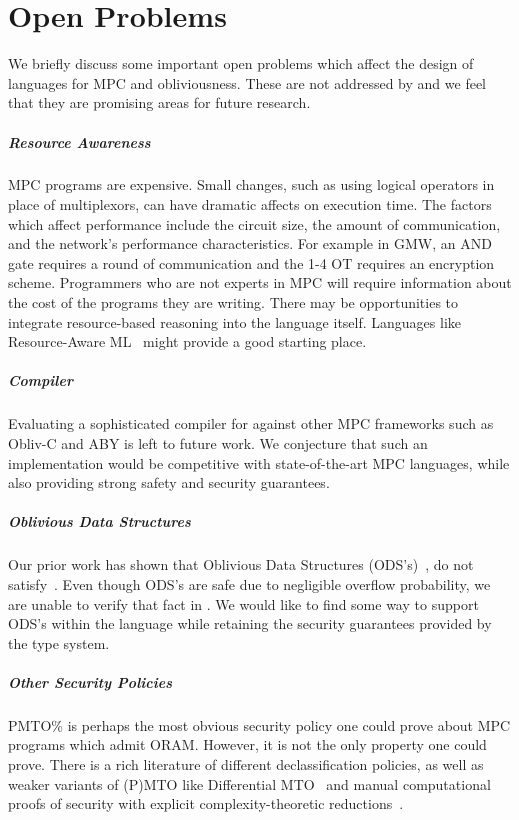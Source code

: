\chapter{Open Problems}
We briefly discuss some important open problems which affect the design of languages for
MPC and obliviousness. These are not addressed by \lang and we feel that they are promising
areas for future research.

\paragraph{Resource Awareness}
MPC programs are expensive. Small changes, such as using logical operators in place of multiplexors, can have dramatic
affects on execution time. The factors which affect performance include the circuit size, the amount of communication,
and the network's performance characteristics. For example in GMW, an AND gate requires a round of communication and the 1-4 OT requires an encryption scheme.
Programmers who are not experts in MPC will require information about the cost of the programs they are writing. There may
be opportunities to integrate resource-based reasoning into the language itself. Languages like Resource-Aware ML~\cite{10.1007/978-3-642-31424-7_64}
might provide a good starting place.

\paragraph{\lang Compiler}
Evaluating a sophisticated compiler for \lang against other MPC frameworks such as Obliv-C and ABY is left to future work. We conjecture
that such an implementation would be competitive with state-of-the-art MPC languages, while also providing strong safety and security
guarantees.

\paragraph{Oblivious Data Structures}
Our prior work has shown that Oblivious Data Structures (ODS's)~\cite{ods}, do not satisfy~.
Even though ODS's are safe due to negligible overflow probability, we are unable to verify that fact in \lang. We would like to find some
way to support ODS's within the language while retaining the security guarantees provided by the type system.

\paragraph{Other Security Policies}
PMTO\% is perhaps the most obvious security policy one could prove about MPC programs which admit ORAM. However, it is not the only property
one could prove. There is a rich literature of different declassification policies, as well as weaker variants of (P)MTO like Differential
MTO~\cite{10.5555/3310435.3310585} and manual computational proofs of security with explicit complexity-theoretic reductions~\cite{easycrypt}.

